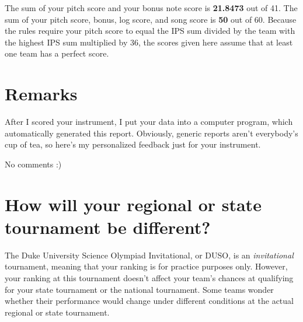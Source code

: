 \documentclass[12pt,letterpaper]{article}
\def\totalScore{50} %
\def\feedback{No comments :)}
\def\pitchScore{21.8473}
\begin{document}
The sum of your pitch score and your bonus note score is \textbf{\pitchScore} out of 41. The sum of your pitch score, bonus, log score, and song score is \textbf{\totalScore} out of 60. Because the rules require your pitch score to equal the IPS sum divided by the team with the highest IPS sum multiplied by 36, the scores given here assume that at least one team has a perfect score.

\section{Remarks}

After I scored your instrument, I put your data into a computer program, which automatically generated this report. Obviously, generic reports aren't everybody's cup of tea, so here's my personalized feedback just for your instrument. %

{\feedback}

\section{How will your regional or state tournament be different?}

The Duke University Science Olympiad Invitational, or DUSO, is an \emph{invitational} tournament, meaning that your ranking is for practice purposes only. However, your ranking at this tournament doesn't affect your team's chances at qualifying for your state tournament or the national tournament. Some teams wonder whether their performance would change under different conditions at the actual regional or state tournament.
\end{document}
